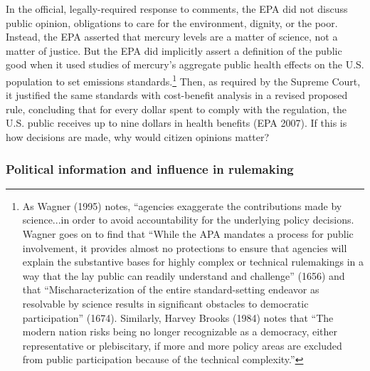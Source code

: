 In the official, legally-required response to comments, the EPA did not discuss public opinion, obligations to care for the environment, dignity, or the poor. Instead, the EPA asserted that mercury levels are a matter of science, not a matter of justice. But the EPA did implicitly assert a definition of the public good when it used studies of mercury's aggregate public health effects on the U.S. population to set emissions standards.\footnote{As Wagner (1995) %
notes, ``agencies exaggerate the contributions made by science...in order to avoid accountability for the underlying policy decisions. %
Wagner goes on to find that  ``While the APA mandates a process for public involvement, it provides almost no protections to ensure that agencies will explain the substantive bases for highly complex or technical rulemakings in a way that the lay public can readily understand and challenge'' (1656) and that ``Mischaracterization of the entire standard-setting endeavor as resolvable by science results in significant obstacles to democratic participation'' (1674). Similarly, Harvey Brooks (1984) %
notes that ``The modern nation risks being no longer recognizable as a democracy, either representative or plebiscitary, if more and more policy areas are excluded from public participation because of the technical complexity.''} 
Then, as required by the Supreme Court, it justified the same standards with cost-benefit analysis in a revised proposed rule, concluding that for every dollar spent to comply with the regulation, the U.S. public receives up to nine dollars in health benefits (EPA 2007). If this is how decisions are made, %
why would citizen opinions matter? %

\subsubsection{Political information and influence in rulemaking}

